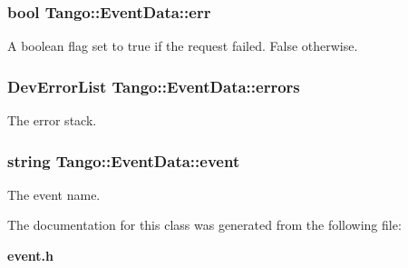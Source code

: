\subsubsection[{err}]{\setlength{\rightskip}{0pt plus 5cm}bool Tango\-::\-Event\-Data\-::err}\label{classTango_1_1EventData_a415f9374bb792e3a638447c66af32523}


A boolean flag set to true if the request failed. False otherwise. 

\subsubsection[{errors}]{\setlength{\rightskip}{0pt plus 5cm}Dev\-Error\-List Tango\-::\-Event\-Data\-::errors}\label{classTango_1_1EventData_abbb35ed304e18a77b63d8b49210329e6}


The error stack. 

\subsubsection[{event}]{\setlength{\rightskip}{0pt plus 5cm}string Tango\-::\-Event\-Data\-::event}\label{classTango_1_1EventData_a346675d2a32c917164b53fa653af173c}


The event name. 



The documentation for this class was generated from the following file\-:\begin{DoxyCompactItemize}
\item 
{\bf event.\-h}\end{DoxyCompactItemize}
